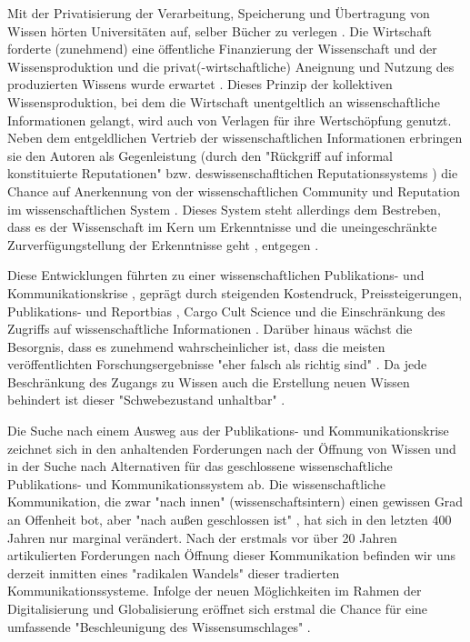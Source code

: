 Mit der Privatisierung der Verarbeitung, Speicherung und Übertragung von Wissen hörten Universitäten auf, selber Bücher zu verlegen \cite{cite:0}. Die Wirtschaft forderte (zunehmend) eine öffentliche Finanzierung der Wissenschaft und der Wissensproduktion und die privat(-wirtschaftliche) Aneignung und Nutzung des produzierten Wissens wurde erwartet \cite{cite:2}. Dieses Prinzip der kollektiven Wissensproduktion, bei dem die Wirtschaft unentgeltlich an wissenschaftliche Informationen gelangt, wird auch von Verlagen für ihre Wertschöpfung genutzt. Neben dem entgeldlichen Vertrieb der wissenschaftlichen Informationen erbringen sie den Autoren als Gegenleistung (durch den "Rückgriff auf informal konstituierte Reputationen" \cite{luhmann_1970_selbststeuerung} bzw. deswissenschafltichen Reputationssystems \cite{suchen}) die Chance auf Anerkennung von der wissenschaftlichen Community und Reputation im wissenschaftlichen System \cite{cite:21a}. Dieses System steht allerdings dem Bestreben, dass es der Wissenschaft im Kern um Erkenntnisse und die uneingeschränkte Zurverfügungstellung der Erkenntnisse geht \cite{hanekop_2006}, entgegen \cite{offhaus_2012_institutionelle_repos}. 

Diese Entwicklungen führten zu einer wissenschaftlichen Publikations- und Kommunikationskrise \cite{suchen}, geprägt durch steigenden Kostendruck, Preissteigerungen, Publikations- \cite{Egger_1997} \cite{Fanelli_2012} und Reportbias \cite{Chan_2008} \cite{Dickersin_2011} , Cargo Cult Science \cite{Feynman_1974} und die Einschränkung des Zugriffs auf wissenschaftliche Informationen \cite{Hess_2006}. Darüber hinaus wächst die Besorgnis, dass es zunehmend wahrscheinlicher ist, dass die meisten veröffentlichten Forschungsergebnisse "eher falsch als richtig sind" \cite{Ioannidis_2005}. Da jede Beschränkung des Zugangs zu Wissen auch die Erstellung neuen Wissen behindert \cite{cite:5} \cite{cite:8} \cite{Luhmann1998} ist dieser "Schwebezustand unhaltbar" \cite{suchen}. 

Die Suche nach einem Ausweg aus der Publikations- und Kommunikationskrise zeichnet sich in den anhaltenden Forderungen nach der Öffnung von Wissen und in der Suche nach Alternativen für das geschlossene wissenschaftliche Publikations- und Kommunikationssystem ab. Die wissenschaftliche Kommunikation, die zwar "nach innen" (wissenschaftsintern) einen gewissen Grad an Offenheit bot, aber "nach außen geschlossen ist" \cite{kelty_2004}, hat sich in den letzten 400 Jahren nur marginal verändert. Nach der erstmals vor über 20 Jahren artikulierten Forderungen nach Öffnung dieser Kommunikation befinden wir uns derzeit inmitten eines "radikalen Wandels" \cite{poynder_2011_suber} dieser tradierten Kommunikationssysteme. Infolge der neuen Möglichkeiten im Rahmen der Digitalisierung und Globalisierung \cite{mcluhan_1963_gutenberg} eröffnet sich erstmal die Chance für eine umfassende "Beschleunigung des Wissensumschlages" \cite{Wenzel_2003}.

